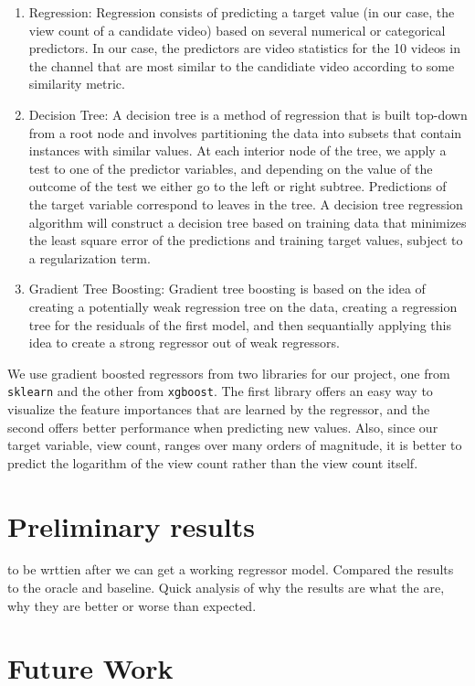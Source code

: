 \documentclass[12pt]{article}
\theoremstyle{definition}
\theoremstyle{remark}
\begin{document}
\begin{enumerate}
\item Regression: Regression consists of predicting a target value (in our case,
  the view count of a candidate video) based on several numerical or categorical
  predictors. In our case, the predictors are video statistics for the 10 videos
  in the channel that are most similar to the candidiate video according to some
  similarity metric.
\item Decision Tree: A decision tree is a method of regression that is built
  top-down from a root node and involves partitioning the data into subsets that
  contain instances with similar values. At each interior node of the tree, we
  apply a test to one of the predictor variables, and depending on the value of
  the outcome of the test we either go to the left or right subtree. Predictions
  of the target variable correspond to leaves in the tree. A decision tree
  regression algorithm will construct a decision tree based on training data
  that minimizes the least square error of the predictions and training target
  values, subject to a regularization term.
\item Gradient Tree Boosting: Gradient tree boosting is based on the idea of
  creating a potentially weak regression tree on the data, creating a regression
  tree for the residuals of the first model, and then sequantially applying this
  idea to create a strong regressor out of weak regressors.
\end{enumerate}
We use gradient boosted regressors from two libraries for our project, one from
\texttt{sklearn} and the other from \texttt{xgboost}. The first library offers
an easy way to visualize the feature importances that are learned by the
regressor, and the second offers better performance when predicting new values.
Also, since our target variable, view count, ranges over many orders of
magnitude, it is better to predict the logarithm of the view count rather than
the view count itself.

\section{Preliminary results}

to be wrttien after we can get a working regressor model. Compared the results to the oracle and baseline.  Quick analysis of why the results are what the are, why they are better or worse than expected.


\section{Future Work}
\end{document}
